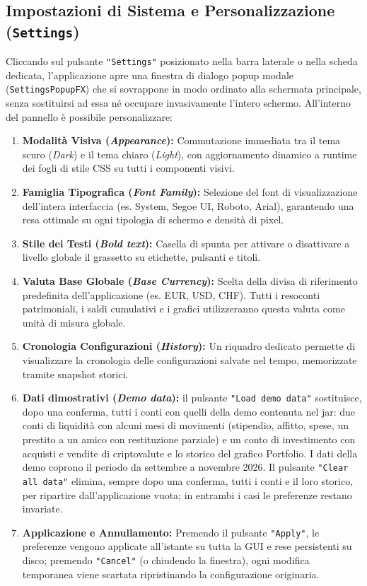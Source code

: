 \documentclass[11pt,a4paper,openright]{report}
\begin{document}
\subsection*{Impostazioni di Sistema e Personalizzazione (\texttt{Settings})}
Cliccando sul pulsante \texttt{"Settings"} posizionato nella barra laterale o nella scheda dedicata, l'applicazione apre una finestra di dialogo popup modale (\texttt{SettingsPopupFX}) che si sovrappone in modo ordinato alla schermata principale, senza sostituirsi ad essa né occupare invasivamente l'intero schermo. All'interno del pannello è possibile personalizzare:
\begin{enumerate}
  \item \textbf{Modalità Visiva (\emph{Appearance}):} Commutazione immediata tra il tema scuro (\emph{Dark}) e il tema chiaro (\emph{Light}), con aggiornamento dinamico a runtime dei fogli di stile CSS su tutti i componenti visivi.
  \item \textbf{Famiglia Tipografica (\emph{Font Family}):} Selezione del font di visualizzazione dell'intera interfaccia (es. System, Segoe UI, Roboto, Arial), garantendo una resa ottimale su ogni tipologia di schermo e densità di pixel.
  \item \textbf{Stile dei Testi (\emph{Bold text}):} Casella di spunta per attivare o disattivare a livello globale il grassetto su etichette, pulsanti e titoli.
  \item \textbf{Valuta Base Globale (\emph{Base Currency}):} Scelta della divisa di riferimento predefinita dell'applicazione (es. EUR, USD, CHF). Tutti i resoconti patrimoniali, i saldi cumulativi e i grafici utilizzeranno questa valuta come unità di misura globale.
  \item \textbf{Cronologia Configurazioni (\emph{History}):} Un riquadro dedicato permette di visualizzare la cronologia delle configurazioni salvate nel tempo, memorizzate tramite snapshot storici.
  \item \textbf{Dati dimostrativi (\emph{Demo data}):} il pulsante \texttt{"Load demo data"} sostituisce, dopo una conferma, tutti i conti con quelli della demo contenuta nel jar: due conti di liquidità con alcuni mesi di movimenti (stipendio, affitto, spese, un prestito a un amico con restituzione parziale) e un conto di investimento con acquisti e vendite di criptovalute e lo storico del grafico Portfolio. I dati della demo coprono il periodo da settembre a novembre 2026. Il pulsante \texttt{"Clear all data"} elimina, sempre dopo una conferma, tutti i conti e il loro storico, per ripartire dall'applicazione vuota; in entrambi i casi le preferenze restano invariate.
  \item \textbf{Applicazione e Annullamento:} Premendo il pulsante \texttt{"Apply"}, le preferenze vengono applicate all'istante su tutta la GUI e rese persistenti su disco; premendo \texttt{"Cancel"} (o chiudendo la finestra), ogni modifica temporanea viene scartata ripristinando la configurazione originaria.
\end{enumerate}
\end{document}
